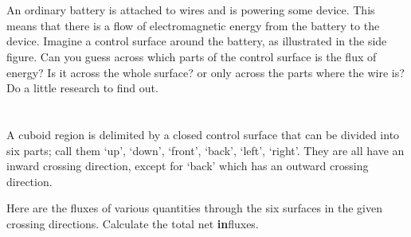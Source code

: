\documentclass[a4paper,12pt,%
onecolumn,oneside,%
british%
]{memoir}
\renewcommand*{\|}[1][]{\nonscript\:#1\vert\nonscript\:\mathopen{}}
\begin{document}
\section{}
\label{sec:battery_wire}

%
An ordinary battery is attached to wires and is powering some device. This means that there is a flow of electromagnetic energy from the battery to the device. Imagine a control surface around the battery, as illustrated in the side figure. Can you guess across which parts of the control surface is the flux of energy? Is it across the whole surface? or only across the parts where the wire is? Do a little research to find out.

\section{}
\label{sec:sum_fluxes}

A cuboid region is delimited by a closed control surface that can be divided into six parts; call them \enquote*{up}, \enquote*{down}, \enquote*{front}, \enquote*{back}, \enquote*{left}, \enquote*{right}. They are all have an inward crossing direction, except for \enquote*{back} which has an outward crossing direction.

Here are the fluxes of various quantities through the six surfaces in the given crossing directions. Calculate the total net \textbf{in}fluxes.\noprelistbreak

\smallskip
\end{document}
